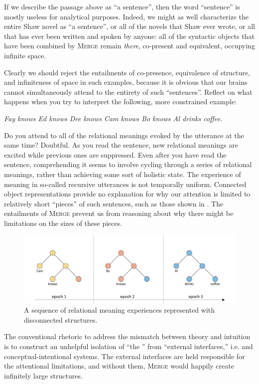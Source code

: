   If we describe the passage above as “a sentence”, then the word “sentence” is mostly useless for analytical purposes. Indeed, we might as well characterize the entire Shaw novel as “a sentence”, or all of the novels that Shaw ever wrote, or all that has ever been written and spoken by anyone: all of the syntactic objects that have been combined by \textsc{Merge} remain \textit{there}, co-present and equivalent, occupying infinite space. 

  Clearly we should reject the entailments of co-presence, equivalence of structure, and infiniteness of space in such examples, because it is obvious that our brains cannot simultaneously attend to the entirety of such “sentences”. Reflect on what happens when you try to interpret the following, more constrained example:

\ea
\textit{Fay knows Ed knows Dee knows Cam knows Bo knows Al drinks coffee.}
\z

  Do you attend to all of the relational meanings evoked by the utterance at the same time? Doubtful. As you read the sentence, new relational meanings are excited while previous ones are suppressed. Even after you have read the sentence, comprehending it seems to involve cycling through a series of relational meanings, rather than achieving some sort of holistic state. The experience of meaning in so-called recursive utterances is not temporally uniform. Connected object representations provide no explanation for why our attention is limited to relatively short “pieces” of such sentences, such as those shown in {}. The entailments of \textsc{Merge} prevent us from reasoning about why there might be limitations on the sizes of these pieces.

  
\begin{figure}
\includegraphics[width=\textwidth]{figures/Tilsen-img111.png}
\caption{A sequence of relational meaning experiences represented with disconnected structures.}
\label{fig:5:7}
\end{figure}
 

  The conventional rhetoric to address the mismatch between theory and intuition is to construct an unhelpful isolation of “the ” from “external interfaces,” i.e.  and conceptual-intentional systems. The external interfaces are held responsible for the attentional limitations, and without them, \textsc{Merge} would happily create infinitely large structures. 

